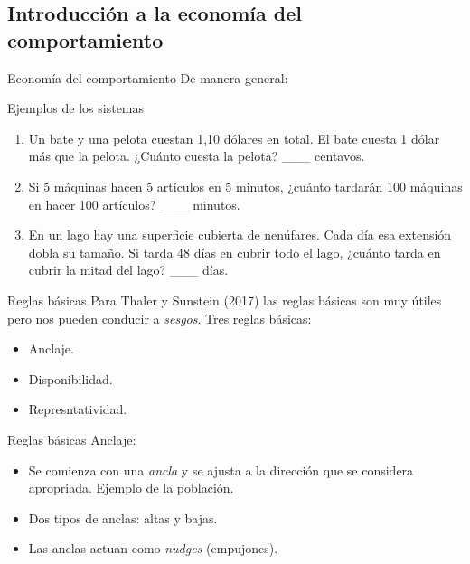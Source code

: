 \documentclass[11pt, aspectratio=169, compress]{beamer}
\begin{document}
\subsection{Introducción a la economía del comportamiento}
\begin{frame}{Economía del comportamiento}
De manera general: 

\end{frame}
\begin{frame}{Ejemplos de los sistemas}
\begin{enumerate}
	\item Un bate y una pelota cuestan 1,10 dólares en total. El bate cuesta 1 dólar
	más que la pelota. ¿Cuánto cuesta la pelota? \_\_\_ centavos.
	\item Si 5 máquinas hacen 5 artículos en 5 minutos, ¿cuánto tardarán 100
	máquinas en hacer 100 artículos? \_\_\_ minutos.
	\item En un lago hay una superficie cubierta de nenúfares. Cada día esa extensión
	dobla su tamaño. Si tarda 48 días en cubrir todo el lago, ¿cuánto tarda en
	cubrir la mitad del lago? \_\_\_ días.
\end{enumerate}
\end{frame}
\begin{frame}{Reglas básicas}
	Para Thaler y Sunstein (2017) las reglas básicas son muy útiles pero nos pueden conducir a \textit{sesgos}. Tres reglas básicas: 
	\begin{itemize}
		\item Anclaje. 
		\item Disponibilidad. 
		\item Represntatividad.  
	\end{itemize}
\end{frame}
\begin{frame}{Reglas básicas}
	Anclaje: 
	\begin{itemize}
		\item Se comienza con una \textit{ancla} y se ajusta a la dirección que se considera apropriada. Ejemplo de la población. 
		\item Dos tipos de anclas: altas y bajas. 
		\item Las anclas actuan como \textit{nudges} (empujones).  
	\end{itemize}
\end{frame}
\end{document}
